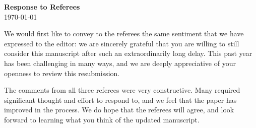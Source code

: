 \documentclass[11pt]{article}
\begin{document}
\newif\ifone
\newif\iftwo
\newif\ifthree
\newif\ifhlt

\onetrue %
\onefalse
\twotrue %
\twofalse
\threetrue %
\hltfalse

\ifone
\newcommand{\one}[2]{\textbf{\textcolor{blue}{1: #1}}\\ \linebreak {#2}\\\noindent\rule{\textwidth}{1pt}\bigskip}
\else
\newcommand{\one}[2]{}
\fi

\iftwo
\newcommand{\two}[2]{\textbf{\textcolor{teal}{2: #1}}\\ \linebreak {#2}\\\noindent\rule{\textwidth}{1pt}\bigskip}
\else
\newcommand{\two}[2]{}
\fi

\ifthree
\newcommand{\three}[2]{\textbf{\textcolor{Maroon}{3: #1}}\\ \linebreak {#2}\\\noindent\rule{\textwidth}{1pt}\bigskip}
\else
\newcommand{\three}[2]{}
\fi

\ifhlt
\newcommand{\hlt}[1]{\hl{#1}}
\else
\newcommand{\hlt}[1]{{#1}}
\fi



\begin{center}
\textbf{\Large{Response to Referees}}\\
\smallskip
\today
\end{center} 
\medskip


We would first like to convey to the referees the same sentiment that we have expressed to the editor: we are sincerely grateful that you are willing to still consider this manuscript after such an extraordinarily long delay.  This past year has been challenging in many ways, and we are deeply appreciative of your openness to review this resubmission. 

The comments from all three referees were very constructive.  Many required significant thought and effort to respond to, and we feel that the paper has improved in the process.  We do hope that the referees will agree, and look forward to learning what you think of the updated manuscript.
\end{document}

